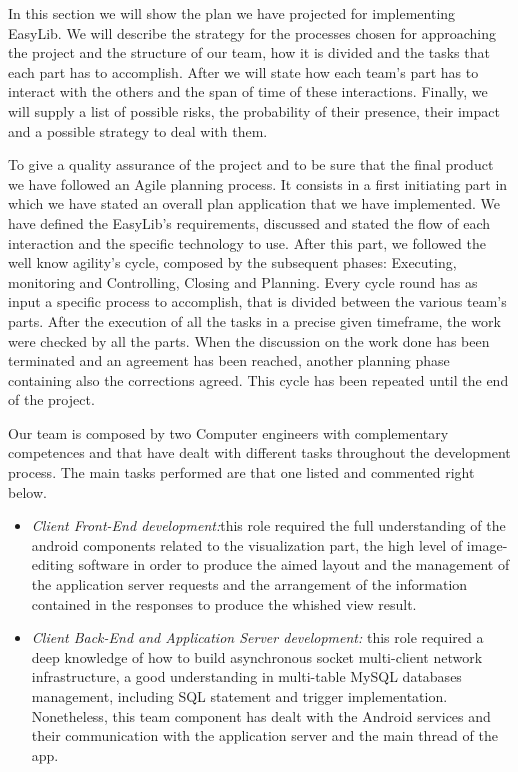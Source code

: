 \vspace*{-5mm}
In this section we will show the plan we have projected for implementing EasyLib. We will describe the strategy for the processes chosen for approaching the project and the structure of our team, how it is divided and the tasks that each part has to accomplish. After we will state how each team’s part has to interact with the others and the span of time of these interactions. Finally, we will supply a list of possible risks, the probability of their presence, their impact and a possible strategy to deal with them.

To give a quality assurance of the project and to be sure that the final product we have followed an Agile planning process. It consists in a first initiating part in which we have stated an overall plan application that we have implemented. We have defined the EasyLib’s requirements, discussed and stated the flow of each interaction and the specific technology to use. 
After this part, we followed the well know agility’s cycle, composed by the subsequent phases: Executing, monitoring and Controlling, Closing and Planning. Every cycle round has as input a specific process to accomplish, that is divided between the various team’s parts. After the execution of all the tasks in a precise given timeframe, the work were checked by all the parts. When the discussion on the work done has been terminated and an agreement has been reached, another planning phase containing also the corrections agreed. This cycle has been repeated until the end of the project.

Our team is composed by two Computer engineers with complementary competences and that have dealt with different tasks throughout the development process. The main tasks performed are that one listed and commented right below.

\begin{itemize}
\item \emph{Client Front-End development:}this role required the full understanding of the android components related to the visualization part, the high level of image-editing software in order to produce the aimed layout and the management of the application server requests and the arrangement of the information contained in the responses to produce the whished view result. 

\item \emph{Client Back-End and Application Server development:} this role required a deep knowledge of how to build asynchronous socket multi-client network infrastructure, a good understanding in multi-table MySQL databases management, including SQL statement and trigger implementation. Nonetheless, this team component has dealt with the Android services and their communication with the application server and the main thread of the app.
\end{itemize}

